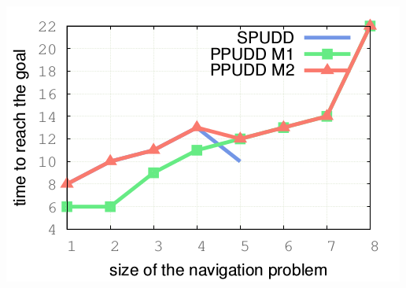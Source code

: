 \documentclass[12pt,svgnames,table]{beamer}
\begin{document}
\begin{frame}
{\begin{minipage}{0.45\linewidth}
 \\
\includegraphics[scale=0.4]{courbePerfMDP2.png} 
\end{minipage} 
}
\end{frame}
\end{document}
